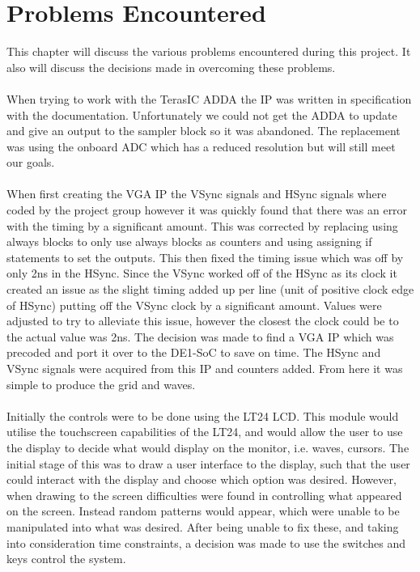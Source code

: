 \documentclass[a4paper,12pt]{article}
\begin{document}
\section{Problems Encountered}
\begin{flushleft}
This chapter will discuss the various problems encountered during this project. It also will discuss the decisions made in overcoming these problems. 
\\ \- \\
When trying to work with the TerasIC ADDA the IP was written in specification with the documentation. Unfortunately we could not get the ADDA to update and give an output to the sampler block so it was abandoned. The replacement was using the onboard ADC which has a reduced resolution but will still meet our goals. 
\\ \- \\
When first creating the VGA IP the VSync signals and HSync signals where coded by the project group however it was quickly found that there was an error with the timing by a significant amount. This was corrected by replacing using always blocks to only use always blocks as counters and using assigning if statements to set the outputs. This then fixed the timing issue which was off by only 2ns in the HSync. Since the VSync worked off of the HSync as its clock it created an issue as the slight timing added up per line (unit of positive clock edge of HSync) putting off the VSync clock by a significant amount. Values were adjusted to try to alleviate this issue, however the closest the clock could be to the actual value was 2ns. The decision was made to find a VGA IP which was precoded and port it over to the DE1-SoC to save on time. The HSync and VSync signals were acquired from this IP and counters added.\cite{stump_2012} From here it was simple to produce the grid and waves.
\\ \- \\
Initially the controls were to be done using the LT24 LCD. This module would utilise the touchscreen capabilities of the LT24, and would allow the user to use the display to decide what would display on the monitor, i.e. waves, cursors. The initial stage of this was to draw a user interface to the display, such that the user could interact with the display and choose which option was desired. However, when drawing to the screen difficulties were found in controlling what appeared on the screen. Instead random patterns would appear, which were unable to be manipulated into what was desired. After being unable to fix these, and taking into consideration time constraints, a decision was made to use the switches and keys control the system. 
\end{flushleft}
\newpage
\end{document}
